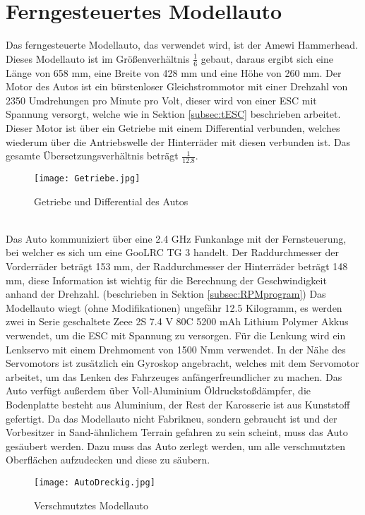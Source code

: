 \section{Ferngesteuertes Modellauto}
\label{sec:Auto}
Das ferngesteuerte Modellauto, das verwendet wird, ist der Amewi Hammerhead. Dieses Modellauto ist im Größenverhältnis $\frac{1}{6}$ gebaut, daraus ergibt sich eine Länge von 658 \ac{mm}, eine Breite von 428 \ac{mm} und eine Höhe von 260 \ac{mm}. Der Motor des Autos ist ein bürstenloser Gleichstrommotor mit einer Drehzahl von 2350 Umdrehungen pro Minute pro Volt, dieser wird von einer \ac{ESC} mit Spannung versorgt, welche wie in Sektion \ref{subsec:tESC} beschrieben arbeitet. Dieser Motor ist über ein Getriebe mit einem Differential verbunden, welches wiederum über die Antriebswelle der Hinterräder mit diesen verbunden ist. Das gesamte Übersetzungsverhältnis beträgt $\frac{1}{12.8}$.
\begin{figure}[h]
\centering
\texttt{[image: Getriebe.jpg]}
\caption{Getriebe und Differential des Autos}
\label{fig:Getriebe}
\end{figure}
\\
Das Auto kommuniziert über eine 2.4 \ac{GHz} Funkanlage mit der Fernsteuerung, bei welcher es sich um eine GooLRC TG 3 handelt. Der Raddurchmesser der Vorderräder beträgt 153 \ac{mm}, der Raddurchmesser der Hinterräder beträgt 148 \ac{mm}, diese Information ist wichtig für die Berechnung der Geschwindigkeit anhand der Drehzahl. (beschrieben in Sektion \ref{subsec:RPMprogram}) Das Modellauto wiegt (ohne Modifikationen) ungefähr 12.5 Kilogramm, es werden zwei in Serie geschaltete Zeee 2S 7.4 \ac{V} 80C 5200 \ac{mAh} Lithium Polymer Akkus verwendet, um die \ac{ESC} mit Spannung zu versorgen. Für die Lenkung wird ein Lenkservo mit einem Drehmoment von 1500 \ac{Nmm} verwendet. In der Nähe des Servomotors ist zusätzlich ein Gyroskop angebracht, welches mit dem Servomotor arbeitet, um das Lenken des Fahrzeuges anfängerfreundlicher zu machen. Das Auto verfügt außerdem über Voll-Aluminium Öldruckstoßdämpfer, die Bodenplatte besteht aus Aluminium, der Rest der Karosserie ist aus Kunststoff gefertigt.
Da das Modellauto nicht Fabrikneu, sondern gebraucht ist und der Vorbesitzer in Sand-ähnlichem Terrain gefahren zu sein scheint, muss das Auto gesäubert werden. Dazu muss das Auto zerlegt werden, um alle verschmutzten Oberflächen aufzudecken und diese zu säubern. 
\begin{figure}[h]
\centering
\texttt{[image: AutoDreckig.jpg]}
\caption{Verschmutztes Modellauto}
\label{fig:AutoDreckig}
\end{figure}
